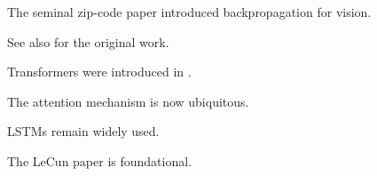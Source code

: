 \documentclass{article}
\begin{document}
The seminal zip-code paper \cite{lecun1989b} introduced backpropagation for vision.

See also \cite{lecun1989,lecun1989b} for the original work.

Transformers were introduced in \cite{vaswani2017preprint}.

The attention mechanism \cite{vaswani2017preprint,vaswani2017} is now ubiquitous.

LSTMs \cite{hochreiter1997} remain widely used.

The LeCun paper \cite{lecun1989} is foundational.



\end{document}
